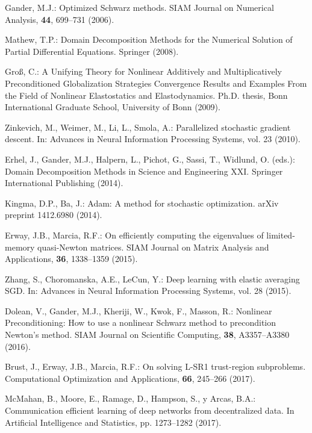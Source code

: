 \documentclass{article}
\begin{document}
\begin{thebibliography}{40.}
 Gander, M.J.: Optimized Schwarz methods. SIAM Journal on Numerical Analysis, \textbf{44}, 699–731 (2006).

 Mathew, T.P.: Domain Decomposition Methods for the Numerical Solution of Partial Differential Equations. Springer (2008). 

 Groß, C.: A Unifying Theory for Nonlinear Additively and Multiplicatively Preconditioned Globalization Strategies Convergence Results and Examples From the Field of Nonlinear Elastostatics and Elastodynamics. Ph.D. thesis, Bonn International Graduate School, University of Bonn (2009).

 Zinkevich, M., Weimer, M., Li, L., Smola, A.: Parallelized stochastic gradient descent. In: Advances in Neural Information Processing Systems, vol. 23 (2010). 

 Erhel, J., Gander, M.J., Halpern, L., Pichot, G., Sassi, T., Widlund, O. (eds.): Domain Decomposition Methods in Science and Engineering XXI. Springer International Publishing (2014).

 Kingma, D.P., Ba, J.: Adam: A method for stochastic optimization. arXiv preprint 1412.6980 (2014).

 Erway, J.B., Marcia, R.F.: On efficiently computing the eigenvalues of limited-memory quasi-Newton matrices. SIAM Journal on Matrix Analysis and Applications, \textbf{36}, 1338–1359 (2015).

 Zhang, S., Choromanska, A.E., LeCun, Y.: Deep learning with elastic averaging SGD. In: Advances in Neural Information Processing Systems, vol. 28 (2015).

 Dolean, V., Gander, M.J., Kheriji, W., Kwok, F., Masson, R.: Nonlinear Preconditioning: How to use a nonlinear Schwarz method to precondition Newton's method. SIAM Journal on Scientific Computing, \textbf{38}, A3357–A3380 (2016). 

 Brust, J., Erway, J.B., Marcia, R.F.: On solving L-SR1 trust-region subproblems. Computational Optimization and Applications, \textbf{66}, 245–266 (2017).

 McMahan, B., Moore, E., Ramage, D., Hampson, S., y Arcas, B.A.: Communication efficient learning of deep networks from decentralized data. In Artificial Intelligence and Statistics, pp. 1273–1282 (2017). 


\end{thebibliography}
\end{document}
